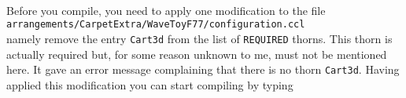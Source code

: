 \documentclass[11pt]{article}
\numberwithin{equation}{section}
\begin{document}
\hspace{1cm}{\tt CactusBase/Boundary}

\hspace{1cm}{\tt CactusBase/CartGrid3D}

\hspace{1cm}{\tt CactusBase/CoordBase}

\hspace{1cm}{\tt CactusBase/IOBasic}

\hspace{1cm}{\tt CactusBase/IOUtil}

\hspace{1cm}{\tt CactusBase/LocalInterp}

\hspace{1cm}{\tt CactusBase/SymBase}

\hspace{1cm}{\tt CactusBase/Time}

\hspace{1cm}{\tt Carpet/Carpet}

\hspace{1cm}{\tt Carpet/CarpetIOASCII}

\hspace{1cm}{\tt Carpet/CarpetIOHDF5}

\hspace{1cm}{\tt Carpet/CarpetInterp}

\hspace{1cm}{\tt Carpet/CarpetLib}

\hspace{1cm}{\tt Carpet/CarpetReduce}

\hspace{1cm}{\tt Carpet/CarpetRegrid}

\hspace{1cm}{\tt Carpet/CarpetSlab}

\hspace{1cm}{\tt CarpetExtra/IDScalarWave}

\hspace{1cm}{\tt CarpetExtra/WaveToyF77}\\

Before you compile, you need to apply one modification to the file\\

{\tt arrangements/CarpetExtra/WaveToyF77/configuration.ccl}\\

namely remove the entry {\tt Cart3d} from the list of {\tt REQUIRED}
thorns. This thorn is actually required but, for some reason unknown
to me, must not be mentioned here. It gave an error message complaining
that there is no thorn {\tt Cart3d}. Having applied this modification
you can start compiling by typing\\
\end{document}
